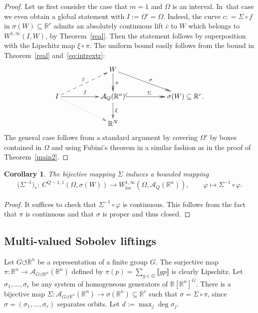 \documentclass[pdftex]{sigma}
\numberwithin{equation}{section}
\newtheorem{Corollary}[Theorem]{Corollary}
\def\si{\sigma}
\def\vh{\varphi}
\def\Si{\Sigma}
\def\Om{\Omega}
\def\R{\mathbb{R}}
\def\cA{\mathcal{A}}
\def\ol{\overline}
\renewcommand{\o}{\circ}
\def\acts{\circlearrowleft}
\let\on=\operatorname
\begin{document}
\begin{proof}
Let us first consider the case that $m =1$ and $\Om$ is an interval. In~that case we even obtain a global statement with $I :=\Om'= \Om$.
Indeed, the curve $c : = \Si \o f$ in $\si(W) \subseteq \R^r$ admits an absolutely continuous lift $\ol c$ to $W$ which belongs to
$W^{1,\infty}(I,W)$, by Theorem~\ref{real}. Then the statement follows by superposition with the Lipschitz map $\xi \o \pi$.
The uniform bound easily follows from the bound in Theorem~\ref{real} and~\eqref{eq:intrextr}:
 \begin{gather*}
\xymatrix{
 && W \ar@{->>}^{\pi}[d] \ar@{->>}^{\si}[drr] && \\
 I \ar^{f}[rr] \ar@{-->}^{\overline c}[rru] \ar@{..>}[rrd]
 && \cA_Q(\R^n) \ar@{->}^{\xi}[d] \ar@{^{(}->>}^{\Si}[rr] && \si(W) \subseteq \R^r. \\
 && \R^N & &
}
 \end{gather*}
 The general case follows from a standard argument by covering $\Om'$ by boxes contained in $\Om$ and
 using Fubini's theorem in a similar fashion as in the proof of Theorem~\ref{main2}.
\end{proof}

\begin{Corollary}
 The bijective mapping $\Si$ induces a bounded mapping
 \begin{gather*}
 \big(\Si^{-1}\big)_* \colon\ C^{Q-1,1}(\Om,\si(W)) \to W^{1,\infty}_{\on{loc}}(\Om,\cA_Q(\R^n)),\qquad \vh \mapsto \Si^{-1} \o \vh.
 \end{gather*}
\end{Corollary}

\begin{proof}
 It suffices to check that $\Si^{-1} \o \vh$ is continuous.
 This follows from the fact that $\pi$ is continuous and that $\si$ is proper and thus closed.
\end{proof}


\subsection{Multi-valued Sobolev liftings}

Let $G\acts \R^n$ be a representation of a finite group $G$.
The surjective map $\pi \colon \R^n \to \cA_{G \acts \R^n}(\R^n)$ defined by $\pi(p) = \sum_{g \in G} \llbracket gp \rrbracket$ is
clearly Lipschitz.
Let $\si_1,\dots,\si_r$ be any system of homogeneous generators of $\R[\R^n]^{G}$.
There is a bijective map $\Si \colon \cA_{G \acts \R^n}(\R^n) \to \si(\R^n) \subseteq \R^r$ such that $\si = \Si \o \pi$, since
$\si=(\si_1,\dots,\si_r)$ separates orbits.
Let $d := \max_j \deg \si_j$.
\end{document}
